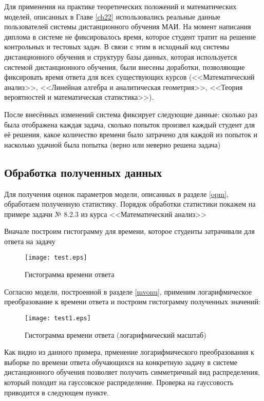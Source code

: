 Для применения на практике теоретических положений и математических моделей, описанных в Главе \ref{ch22} использовались реальные данные пользователей системы дистанцион\-ного обучения МАИ. На момент написания диплома в системе не фиксировалось время, которое студент тратит на решение конт\-рольных и тестовых задач. В связи с этим в исходный код системы дистан\-ционного обучения и структуру базы данных, которая исполь\-зуется системой дистанционного обучения, были внесены доработки, позволяющие фикси\-ровать время ответа для всех существующих курсов (<<Математический ана\-лиз>>, <<Линейная алгебра и аналитическая геометрия>>, <<Теория вероятностей и математическая статистика>>).

После внесённых изменений система фиксирует следующие данные: сколь\-ко раз была отображена каждая задача, сколько попыток произвел каждый студент для её решения, какое количество времени было затрачено для каждой из попыток и насколько удачной была попытка (верно или неверно решена задача)

\subsection{Обработка полученных данных}

Для получения оценок параметров модели, описанных в разделе \ref{opm}, обработаем полученную статистику. Порядок обработки статистики покажем на примере задачи № 8.2.3 из курса <<Математический анализ>>

Вначале построим гистограмму для времени, которое студенты затра\-чивали для ответа на задачу
\begin{figure}[ht!]
\centering \texttt{[image: test.eps]}
\caption{Гистограмма времени ответа}
\end{figure}

Согласно модели, построенной в разделе \ref{mvonu}, применим логарифми\-ческое преобразование к времени ответа и построим гистограмму полученных значений:
\begin{figure}[ht!]
\centering \texttt{[image: test1.eps]}
\caption{Гистограмма времени ответа (логарифмический масштаб)}
\end{figure}

Как видно из данного примера, прменение логарифмического преобра\-зования к выборке по времени ответа обучающихся на конкретную задачу в системе дистанционного обучения позволяет получить симметричный вид распределения, который походит на гауссовское распределение. Проверка на гауссовость приводится в следующем пункте.


